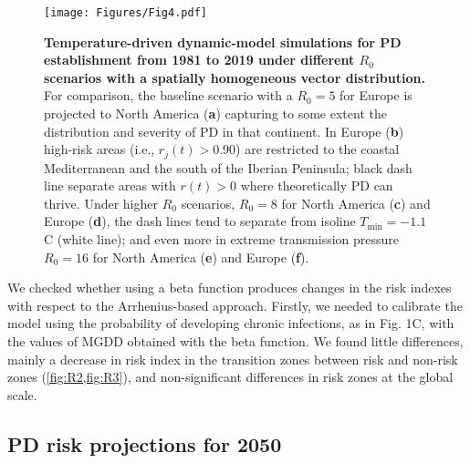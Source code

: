     \begin{figure}[H]
        \centering
        \texttt{[image: Figures/Fig4.pdf]}
        \caption{\textbf{Temperature-driven dynamic-model simulations for PD
                establishment from 1981 to 2019 under different $R_0$ scenarios
                with a
                spatially homogeneous vector distribution.} For comparison, the
            baseline
            scenario with a $R_0=5$ for Europe is projected to North America
            (\textbf{a})
            capturing to some extent the distribution and severity of PD in
            that continent.
            In Europe (\textbf{b}) high-risk areas (i.e., $r_j(t) > 0.90$) are
            restricted
            to the coastal Mediterranean and the south of the Iberian
            Peninsula; black dash
            line separate areas with $r(t)>0$ where theoretically PD can
            thrive. Under
            higher $R_0$ scenarios, $R_0=8$ for North America (\textbf{c}) and
            Europe
            (\textbf{d}), the dash lines tend to separate from isoline
            $T_{\textrm{min}} =
                -1.1$\textdegree C (white line); and even more in extreme
            transmission pressure
            $R_0=16$ for North America (\textbf{e}) and Europe (\textbf{f}). }
        \label{fig4}
    \end{figure}

    We checked whether using a beta function produces changes in the risk
    indexes
    with respect to the Arrhenius-based approach. Firstly, we needed to
    calibrate
    the model using the probability of developing chronic infections, as in
    Fig.
    1C, with the values of MGDD obtained with the beta function. We found
    little
    differences, mainly a decrease in risk index in the transition zones
    between
    risk and non-risk zones (\cref{fig:R2,fig:R3}), and non-significant
    differences in risk zones at the global scale.

    \subsection{PD risk projections for 2050}

